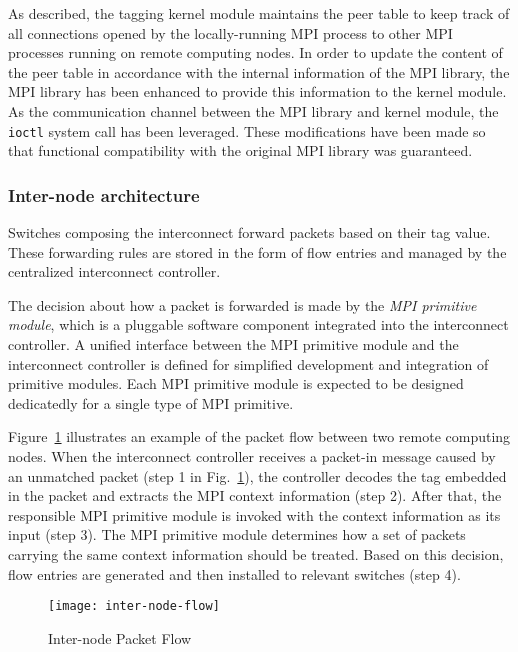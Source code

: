 As described, the tagging kernel module maintains the peer table to keep
track of all connections opened by the locally-running MPI process to
other MPI processes running on remote computing nodes. In order to
update the content of the peer table in accordance with the internal
information of the MPI library, the MPI library has been enhanced to
provide this information to the kernel module. As the communication
channel between the MPI library and kernel module, the
\lstinline!ioctl! system call has been leveraged. These
modifications have been made so that functional compatibility with the
original MPI library was guaranteed.

\subsubsection{Inter-node architecture}

Switches composing the interconnect forward packets based on their tag
value. These forwarding rules are stored in the form of flow entries and
managed by the centralized interconnect controller.

The decision about how a packet is forwarded is made by the \emph{MPI
primitive module}, which is a pluggable software component integrated
into the interconnect controller. A unified interface between the MPI
primitive module and the interconnect controller is defined for
simplified development and integration of primitive modules. Each MPI
primitive module is expected to be designed dedicatedly for a single
type of MPI primitive.

Figure~\ref{fig:inter-node-flow} illustrates an example of the packet
flow between two remote computing nodes. When the interconnect
controller receives a packet-in message caused by an unmatched packet
(step 1 in Fig.~\ref{fig:inter-node-flow}), the controller decodes the
tag embedded in the packet and extracts the MPI context information
(step 2). After that, the responsible MPI primitive module is invoked
with the context information as its input (step 3). The MPI primitive
module determines how a set of packets carrying the same context
information should be treated. Based on this decision, flow entries are
generated and then installed to relevant switches (step 4).

\begin{figure}
    \centering
    \texttt{[image: inter-node-flow]}
    \caption{Inter-node Packet Flow}%
    \label{fig:inter-node-flow}
\end{figure}

